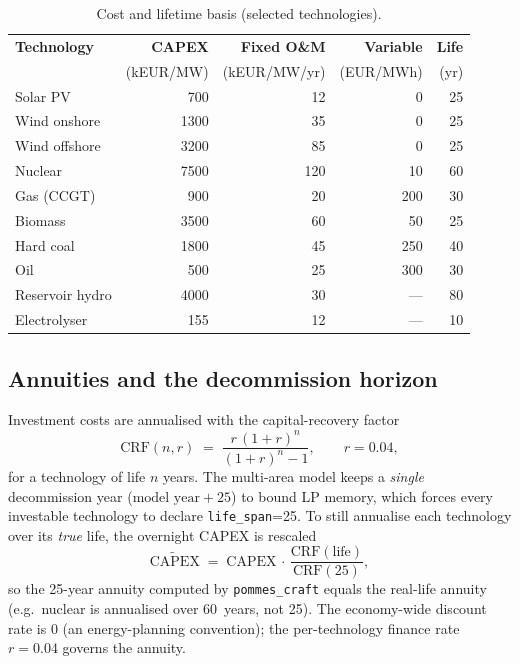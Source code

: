 \documentclass[11pt,a4paper]{article}
\begin{document}
\begin{table}[ht]
\centering
\caption{Cost and lifetime basis (selected technologies).}
\label{tab:costs}
\small
\begin{tabular}{@{}lrrrr@{}}
\toprule
\textbf{Technology} & \textbf{CAPEX} & \textbf{Fixed O\&M} & \textbf{Variable} & \textbf{Life} \\
                    & (kEUR/MW) & (kEUR/MW/yr) & (EUR/MWh) & (yr) \\
\midrule
Solar PV          & 700  & 12  & 0   & 25 \\
Wind onshore      & 1300 & 35  & 0   & 25 \\
Wind offshore     & 3200 & 85  & 0   & 25 \\
Nuclear           & 7500 & 120 & 10  & 60 \\
Gas (CCGT)        & 900  & 20  & 200 & 30 \\
Biomass           & 3500 & 60  & 50  & 25 \\
Hard coal         & 1800 & 45  & 250 & 40 \\
Oil               & 500  & 25  & 300 & 30 \\
Reservoir hydro   & 4000 & 30  & --- & 80 \\
Electrolyser      & 155  & 12  & --- & 10 \\
\bottomrule
\end{tabular}
\end{table}

\subsection{Annuities and the decommission horizon}
Investment costs are annualised with the capital-recovery factor
\begin{equation}
\mathrm{CRF}(n,r) \;=\; \frac{r\,(1+r)^n}{(1+r)^n - 1}, \qquad r = 0.04,
\label{eq:crf}
\end{equation}
for a technology of life $n$ years. The multi-area model keeps a \emph{single} decommission year
($\text{model year}+25$) to bound LP memory, which forces every investable technology to declare
\texttt{life\_span}=25. To still annualise each technology over its \emph{true} life, the overnight
CAPEX is rescaled
\begin{equation}
\widetilde{\mathrm{CAPEX}} \;=\; \mathrm{CAPEX}\,\cdot\,\frac{\mathrm{CRF}(\text{life})}{\mathrm{CRF}(25)},
\label{eq:rescale}
\end{equation}
so the 25-year annuity computed by \texttt{pommes\_craft} equals the real-life annuity (e.g.\ nuclear
is annualised over 60~years, not 25). The economy-wide discount rate is 0 (an energy-planning
convention); the per-technology finance rate $r=0.04$ governs the annuity.
\end{document}
